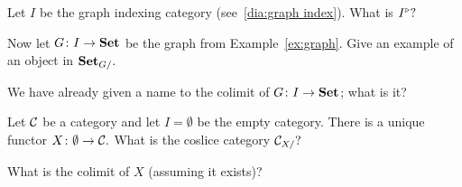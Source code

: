 \documentclass[../main/CT4S-EN-RU]{subfiles}
\begin{document}
\begin{exerciseENG}
Let $I$ be the graph indexing category (see~\ref{dia:graph index}).
\sexc What is $I^\triangleright?$
\item Now let $G\colon I\rightarrow{\mathbf{Set}}$ be the graph from Example~\ref{ex:graph}. Give an example of an object in ${\mathbf{Set}}_{G/}.$ 
\item We have already given a name to the colimit of $G\colon I\rightarrow{\mathbf{Set}}$; what is it?
\endsexc
\end{exerciseENG}

\begin{exerciseRUS}
\end{exerciseRUS}

\begin{exerciseENG}\label{exc:initial as colimit}
Let $\mathcal{C}$ be a category and let $I=\emptyset$ be the empty category. There is a unique functor $X\colon\emptyset\rightarrow\mathcal{C}.$
\sexc What is the coslice category $\mathcal{C}_{X/}?$
\item What is the colimit of $X$ (assuming it exists)?
\endsexc
\end{exerciseENG}

\begin{exerciseRUS}\label{exc:initial as colimit}
\end{exerciseRUS}
\end{document}

